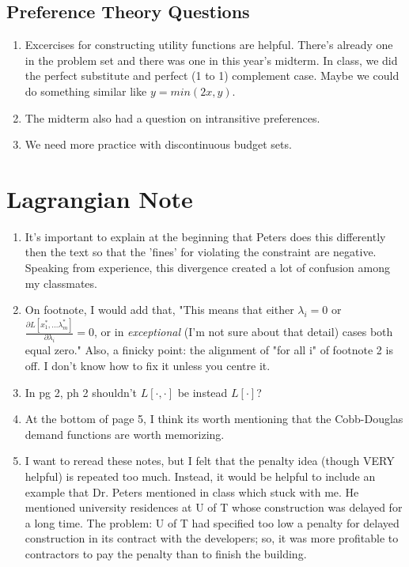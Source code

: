 \documentclass[12pt, fleqn]{article}
\begin{document}
\subsection{Preference Theory Questions}

\begin{enumerate}
	\item Excercises for constructing utility functions are helpful.  There's already one in the problem set and there was one in this year's midterm.  In class, we did the perfect substitute and perfect (1 to 1) complement case.  Maybe we could do something similar like $y=min(2x,y)$.
	\item The midterm also had a question on intransitive preferences.
	\item We need more practice with discontinuous budget sets.  
\end{enumerate}

\section{Lagrangian Note}

\begin{enumerate}
   \item It's important to explain at the beginning that Peters does this differently then the text so that the 'fines' for violating the constraint are negative.  Speaking from experience, this divergence created a lot of confusion among my classmates.  
   \item On footnote, I would add that, "This means that either $\lambda_{i}=0$ or $\frac{\partial L\left[  x_{1}^{\ast},\dots\lambda_{m}^{\ast
}\right]  }{\partial\lambda_{i}}=0$, or in \textit{exceptional} (I'm not sure about that detail) cases both equal zero."  Also, a finicky point: the alignment of "for all i" of footnote 2 is off.  I don't know how to fix it unless you centre it.  
   \item In pg 2, ph 2 shouldn't $L\left[  \cdot,\cdot\right]  $ be instead $L\left[  \cdot\right]  $?
   \item At the bottom of page 5, I think its worth mentioning that the Cobb-Douglas demand functions are worth memorizing.  
   \item I want to reread these notes, but I felt that the penalty idea (though VERY helpful) is repeated too much.  Instead, it would be helpful to include an example that Dr. Peters mentioned in class which stuck with me.  He mentioned university residences at U of T whose construction was delayed for a long time.  The problem: U of T had specified too low a penalty for delayed construction in its contract with the developers; so, it was more profitable to contractors to pay the penalty than to finish the building.  
\end{enumerate}
\end{document}
